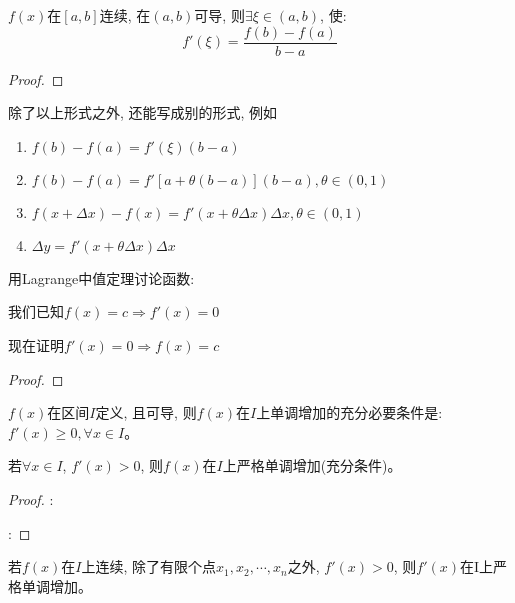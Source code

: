 \begin{theorem}[Lagrange中值定理]
    $f(x)$在$[a, b]$连续, 在$(a, b)$可导, 则$\exists \xi \in (a, b)$, 使:
    \begin{equation*}
        f'(\xi) = \frac{f(b)-f(a)}{b-a}
    \end{equation*}
\end{theorem}
\begin{proof}
    
\end{proof}
\begin{remark}
    除了以上形式之外, 还能写成别的形式, 例如
    \begin{enumerate}
        \item $f(b)-f(a)=f'(\xi)(b-a)$
        \item $f(b)-f(a)=f'[a+\theta(b-a)](b-a), \theta \in (0, 1)$
        \item $f(x+\Delta x) - f(x) = f'(x+\theta \Delta x)\Delta x, \theta \in (0, 1)$
        \item $\Delta y = f'(x+\theta \Delta x)\Delta x$
    \end{enumerate}
\end{remark}

\begin{example}
    用Lagrange中值定理讨论函数:

    我们已知$f(x) = c \Rightarrow f'(x) = 0$

    现在证明$f'(x) = 0 \Rightarrow f(x) = c$
\end{example}
\begin{proof}
    
\end{proof}

\begin{theorem}[一阶导数与函数的单调性关系]
    $f(x)$在区间$I$定义, 且可导, 则$f(x)$在$I$上单调增加的充分必要条件是: $f'(x) \ge 0, \forall x \in I$。

    若$\forall x \in I$, $f'(x) > 0$, 则$f(x)$在$I$上严格单调增加(充分条件)。
\end{theorem}
\begin{proof}
    :

    :

\end{proof}
\begin{remark}
    若$f(x)$在$I$上连续, 除了有限个点$x_1, x_2, \cdots, x_n$之外, $f'(x)>0$, 则$f'(x)$在I上严格单调增加。
\end{remark}

